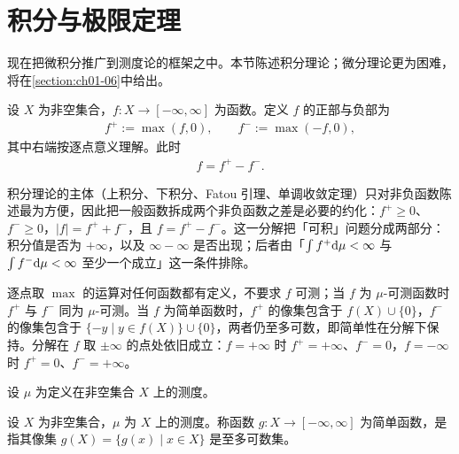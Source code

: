 \documentclass[../../main.tex]{subfiles}%
\begin{document}
\section{积分与极限定理}\label{section:ch01-03}

现在把微积分推广到测度论的框架之中。本节陈述积分理论；微分理论更为困难，将在\cref{section:ch01-06}中给出。%

\begin{definition*}[正部与负部]\label{definition:ch01-1-3-正负部}
设 $X$ 为非空集合，$f:X\to[-\infty,\infty]$ 为函数。定义 $f$ 的正部与负部为
\begin{align*}
f^{+}:=\max(f,0),\qquad f^{-}:=\max(-f,0),
\end{align*}
其中右端按逐点意义理解。此时
\begin{align*}
f=f^{+}-f^{-}.
\end{align*}
\end{definition*}

\begin{remark}\label{remark:ch01-1-3-正负部}
积分理论的主体（上积分、下积分、Fatou 引理、单调收敛定理）只对非负函数陈述最为方便，因此把一般函数拆成两个非负函数之差是必要的约化：$f^{+}\geqslant0$、$f^{-}\geqslant0$，$\lvert f\rvert=f^{+}+f^{-}$，且 $f=f^{+}-f^{-}$。这一分解把「可积」问题分成两部分：积分值是否为 $+\infty$，以及 $\infty-\infty$ 是否出现；后者由「$\int f^{+}\mathrm{d}\mu<\infty$ 与 $\int f^{-}\mathrm{d}\mu<\infty$ 至少一个成立」这一条件排除。

逐点取 $\max$ 的运算对任何函数都有定义，不要求 $f$ 可测；当 $f$ 为 $\mu$-可测函数时 $f^{+}$ 与 $f^{-}$ 同为 $\mu$-可测。当 $f$ 为简单函数时，$f^{+}$ 的像集包含于 $f(X)\cup\{0\}$，$f^{-}$ 的像集包含于 $\{-y\mid y\in f(X)\}\cup\{0\}$，两者仍至多可数，即简单性在分解下保持。分解在 $f$ 取 $\pm\infty$ 的点处依旧成立：$f=+\infty$ 时 $f^{+}=+\infty$、$f^{-}=0$，$f=-\infty$ 时 $f^{+}=0$、$f^{-}=+\infty$。
\end{remark}

设 $\mu$ 为定义在非空集合 $X$ 上的测度。

\begin{definition}[简单函数]\label{definition:ch01-1-11}
设 $X$ 为非空集合，$\mu$ 为 $X$ 上的测度。称函数 $g:X\to[-\infty,\infty]$ 为简单函数，是指其像集 $g(X)=\{g(x)\mid x\in X\}$ 是至多可数集。
\end{definition}
\end{document}

